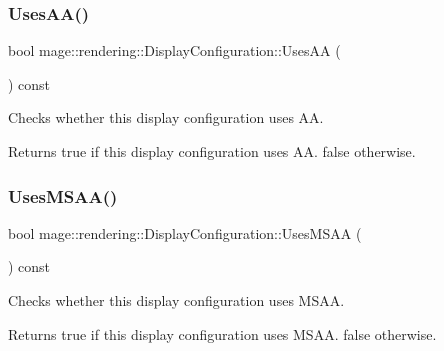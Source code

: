 \subsubsection{\texorpdfstring{Uses\+A\+A()}{UsesAA()}}
{\footnotesize\ttfamily bool mage\+::rendering\+::\+Display\+Configuration\+::\+Uses\+AA (\begin{DoxyParamCaption}{ }\end{DoxyParamCaption}) const\hspace{0.3cm}{\ttfamily [noexcept]}}

Checks whether this display configuration uses AA.

\begin{DoxyReturn}{Returns}
{\ttfamily true} if this display configuration uses AA. {\ttfamily false} otherwise. 
\end{DoxyReturn}
\mbox{\label{classmage_1_1rendering_1_1_display_configuration_a1cd8c25ade06ad47945ca0046e350749}} 
\subsubsection{\texorpdfstring{Uses\+M\+S\+A\+A()}{UsesMSAA()}}
{\footnotesize\ttfamily bool mage\+::rendering\+::\+Display\+Configuration\+::\+Uses\+M\+S\+AA (\begin{DoxyParamCaption}{ }\end{DoxyParamCaption}) const\hspace{0.3cm}{\ttfamily [noexcept]}}

Checks whether this display configuration uses M\+S\+AA.

\begin{DoxyReturn}{Returns}
{\ttfamily true} if this display configuration uses M\+S\+AA. {\ttfamily false} otherwise. 
\end{DoxyReturn}
\mbox{\label{classmage_1_1rendering_1_1_display_configuration_ad233d7838a302fa0ce73cf06b1660404}} 

